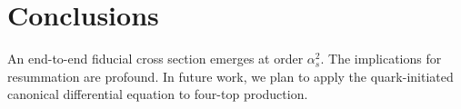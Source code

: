 \section{Conclusions}\label{sec:conclusions}

An end-to-end fiducial cross section emerges at order $\alpha_s^2$. The
implications for resummation are profound. In future work, we plan to
apply the quark-initiated canonical differential equation to four-top
production.

